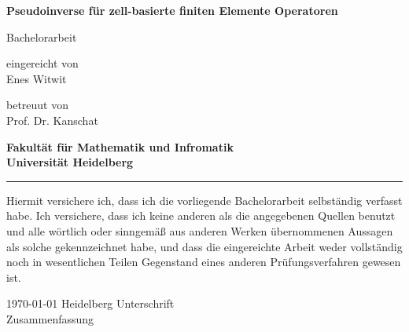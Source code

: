 \documentclass[12pt,a4paper]{scrartcl}
\numberwithin{equation}{section}
\begin{document}
\pagestyle{empty}




\begin{titlepage}

\vspace*{1cm} 
\begin{center} 


\textbf{\Huge Pseudoinverse für zell-basierte finiten Elemente Operatoren} 
\vspace*{2cm}

{\Large Bachelorarbeit}
\vspace*{1cm}


eingereicht von \\[0.5cm]

{\Large Enes Witwit}
\vspace*{1cm}

betreuut von  \\[0.5cm]
{\Large Prof. Dr. Kanschat}
\vspace*{3cm}

\textbf{
Fakultät für Mathematik und Infromatik\\[1cm]
Universität Heidelberg}
\end{center}
\end{titlepage}



\newpage
\thispagestyle{empty}
\vspace*{14cm}

\noindent\rule{16cm}{0.4pt}

Hiermit versichere ich, dass ich die vorliegende Bachelorarbeit selbständig
verfasst habe.
Ich versichere, dass ich keine anderen als die angegebenen Quellen benutzt und
alle wörtlich oder sinngemäß aus anderen Werken übernommenen Aussagen als
solche gekennzeichnet habe, und dass die eingereichte Arbeit weder vollständig
noch in wesentlichen Teilen Gegenstand eines anderen Prüfungsverfahren
gewesen ist. \\[2ex] 

\noindent

\today \hspace*{1cm}  Heidelberg \hspace*{5cm} Unterschrift\\[5ex]


\newpage
Zusammenfassung
\end{document}
